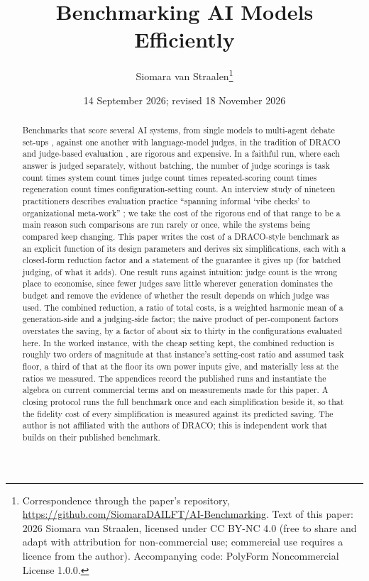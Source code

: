 \documentclass[11pt]{article}
\title{Benchmarking AI Models Efficiently}
\author{Siomara van Straalen\thanks{Correspondence through the paper's repository, \url{https://github.com/SiomaraDAILFT/AI-Benchmarking}. Text of this paper: \textcopyright{} 2026 Siomara van Straalen, licensed under CC BY-NC 4.0 (free to share and adapt with attribution for non-commercial use; commercial use requires a licence from the author). Accompanying code: PolyForm Noncommercial License 1.0.0.}}
\date{14 September 2026; revised 18 November 2026}
\newcommand{\Theauthorisare}{The author is}
\begin{document}
\maketitle

\begin{abstract}
Benchmarks that score several AI systems, from single models to multi-agent debate set-ups \citep{du2023multiagent, liang2024encouraging}, against one another with language-model judges, in the tradition of DRACO \citep{draco2026} and judge-based evaluation \citep{zheng2023judging}, are rigorous and expensive. In a faithful run, where each answer is judged separately, without batching, the number of judge scorings is task count times system count times judge count times repeated-scoring count times regeneration count times configuration-setting count. An interview study of nineteen practitioners describes evaluation practice ``spanning informal `vibe checks' to organizational meta-work'' \citep{vandermaden2026gap}; we take the cost of the rigorous end of that range to be a main reason such comparisons are run rarely or once, while the systems being compared keep changing. This paper writes the cost of a DRACO-style benchmark as an explicit function of its design parameters and derives six simplifications, each with a closed-form reduction factor and a statement of the guarantee it gives up (for batched judging, of what it adds). One result runs against intuition: judge count is the wrong place to economise, since fewer judges save little wherever generation dominates the budget and remove the evidence of whether the result depends on which judge was used. The combined reduction, a ratio of total costs, is a weighted harmonic mean of a generation-side and a judging-side factor; the naive product of per-component factors overstates the saving, by a factor of about six to thirty in the configurations evaluated here. In the worked instance, with the cheap setting kept, the combined reduction is roughly two orders of magnitude at that instance's setting-cost ratio and assumed task floor, a third of that at the floor its own power inputs give, and materially less at the ratios we measured. The appendices record the published runs and instantiate the algebra on current commercial terms and on measurements made for this paper. A closing protocol runs the full benchmark once and each simplification beside it, so that the fidelity cost of every simplification is measured against its predicted saving. \Theauthorisare{} not affiliated with the authors of DRACO; this is independent work that builds on their published benchmark.
\end{abstract}
\end{document}

